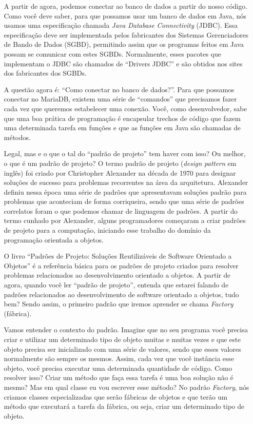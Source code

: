 A partir de agora, podemos conectar ao banco de dados a partir do nosso código. Como você deve saber, para que possamos usar um banco de dados em Java, nós usamos uma especificação chamada \textit{Java Database Connectivity} (JDBC). Essa especificação deve ser implementada pelos fabricantes dos Sistemas Gerenciadores de Bando de Dados (SGBD), permitindo assim que os programas feitos em Java possam se comunicar com estes SGBDs. Normalmente, esses pacotes que implementam o JDBC são chamados de ``Drivers JDBC'' e são obtidos nos sites dos fabricantes dos SGBDs.

A questão agora é: ``Como conectar no banco de dados?''. Para que possamos conectar no MariaDB, existem uma série de ``comandos'' que precisamos fazer cada vez que queremos estabelecer uma conexão. Você, como desenvolvedor, sabe que uma boa prática de programação é encapsular trechos de código que fazem uma determinada tarefa em funções e que as funções em Java são chamadas de métodos.

Legal, mas e o que o tal do ``padrão de projeto'' tem haver com isso? Ou melhor, o que é um padrão de projeto? O termo padrão de projeto (\textit{design pattern} em inglês) foi criado por Christopher Alexander \cite{Alexander1977} na década de 1970 para designar soluções de sucesso para problemas recorrentes na área da arquitetura. Alexander definiu nessa época uma série de padrões que apresentavam soluções padrão para problemas que aconteciam de forma corriqueira, sendo que uma série de padrões correlatos foram o que podemos chamar de linguagem de padrões. A partir do termo cunhado por Alexander, alguns programadores começaram a criar padrões de projeto para a computação, iniciando esse trabalho do domínio da programação orientada a objetos.

O livro ``Padrões de Projeto: Soluções Reutilizáveis de Software Orientado a Objetos'' \cite{Gamma2000} é a referência básica para os padrões de projeto criados para resolver problemas relacionados ao desenvolvimento orientado a objetos. A partir de agora, quando você ler ``padrão de projeto'', entenda que estarei falando de padrões relacionados ao desenvolvimento de software orientado a objetos, tudo bem? Sendo assim, o primeiro padrão que iremos aprender se chama \textit{Factory} (fábrica). 

Vamos entender o contexto do padrão. Imagine que no seu programa você precisa criar e utilizar um determinado tipo de objeto muitas e muitas vezes e que este objeto precisa ser inicializado com uma série de valores, sendo que esses valores normalmente são sempre os mesmos. Assim, cada vez que você instância esse objeto, você precisa executar uma determinada quantidade de código. Como resolver isso? Criar um método que faça essa tarefa é uma boa solução não é mesmo? Mas em qual classe eu vou escrever esse método? No padrão \textit{Factory}, nós criamos classes especializadas que serão fábricas de objetos e que terão um método que executará a tarefa da fábrica, ou seja, criar um determinado tipo de objeto.

